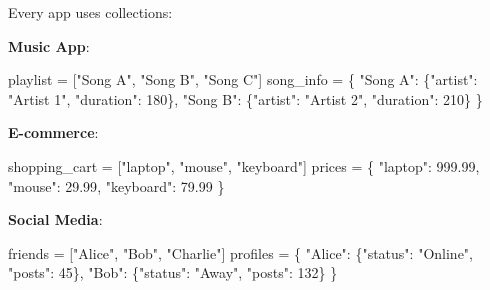 \documentclass[
  letterpaper,
  DIV=11,
  numbers=noendperiod,
  oneside]{scrreprt}
\newenvironment{Shaded}{}{}
\newcommand{\DecValTok}[1]{\textcolor[rgb]{0.00,0.36,0.77}{#1}}
\newcommand{\FloatTok}[1]{\textcolor[rgb]{0.00,0.36,0.77}{#1}}
\newcommand{\NormalTok}[1]{\textcolor[rgb]{0.14,0.16,0.18}{#1}}
\newcommand{\OperatorTok}[1]{\textcolor[rgb]{0.14,0.16,0.18}{#1}}
\newcommand{\StringTok}[1]{\textcolor[rgb]{0.01,0.18,0.38}{#1}}
\begin{document}
Every app uses collections:

\textbf{Music App}:

\begin{Shaded}
\begin{Highlighting}[]
\NormalTok{playlist }\OperatorTok{=}\NormalTok{ [}\StringTok{"Song A"}\NormalTok{, }\StringTok{"Song B"}\NormalTok{, }\StringTok{"Song C"}\NormalTok{]}
\NormalTok{song\_info }\OperatorTok{=}\NormalTok{ \{}
    \StringTok{"Song A"}\NormalTok{: \{}\StringTok{"artist"}\NormalTok{: }\StringTok{"Artist 1"}\NormalTok{, }\StringTok{"duration"}\NormalTok{: }\DecValTok{180}\NormalTok{\},}
    \StringTok{"Song B"}\NormalTok{: \{}\StringTok{"artist"}\NormalTok{: }\StringTok{"Artist 2"}\NormalTok{, }\StringTok{"duration"}\NormalTok{: }\DecValTok{210}\NormalTok{\}}
\NormalTok{\}}
\end{Highlighting}
\end{Shaded}

\textbf{E-commerce}:

\begin{Shaded}
\begin{Highlighting}[]
\NormalTok{shopping\_cart }\OperatorTok{=}\NormalTok{ [}\StringTok{"laptop"}\NormalTok{, }\StringTok{"mouse"}\NormalTok{, }\StringTok{"keyboard"}\NormalTok{]}
\NormalTok{prices }\OperatorTok{=}\NormalTok{ \{}
    \StringTok{"laptop"}\NormalTok{: }\FloatTok{999.99}\NormalTok{,}
    \StringTok{"mouse"}\NormalTok{: }\FloatTok{29.99}\NormalTok{,}
    \StringTok{"keyboard"}\NormalTok{: }\FloatTok{79.99}
\NormalTok{\}}
\end{Highlighting}
\end{Shaded}

\textbf{Social Media}:

\begin{Shaded}
\begin{Highlighting}[]
\NormalTok{friends }\OperatorTok{=}\NormalTok{ [}\StringTok{"Alice"}\NormalTok{, }\StringTok{"Bob"}\NormalTok{, }\StringTok{"Charlie"}\NormalTok{]}
\NormalTok{profiles }\OperatorTok{=}\NormalTok{ \{}
    \StringTok{"Alice"}\NormalTok{: \{}\StringTok{"status"}\NormalTok{: }\StringTok{"Online"}\NormalTok{, }\StringTok{"posts"}\NormalTok{: }\DecValTok{45}\NormalTok{\},}
    \StringTok{"Bob"}\NormalTok{: \{}\StringTok{"status"}\NormalTok{: }\StringTok{"Away"}\NormalTok{, }\StringTok{"posts"}\NormalTok{: }\DecValTok{132}\NormalTok{\}}
\NormalTok{\}}
\end{Highlighting}
\end{Shaded}
\end{document}
